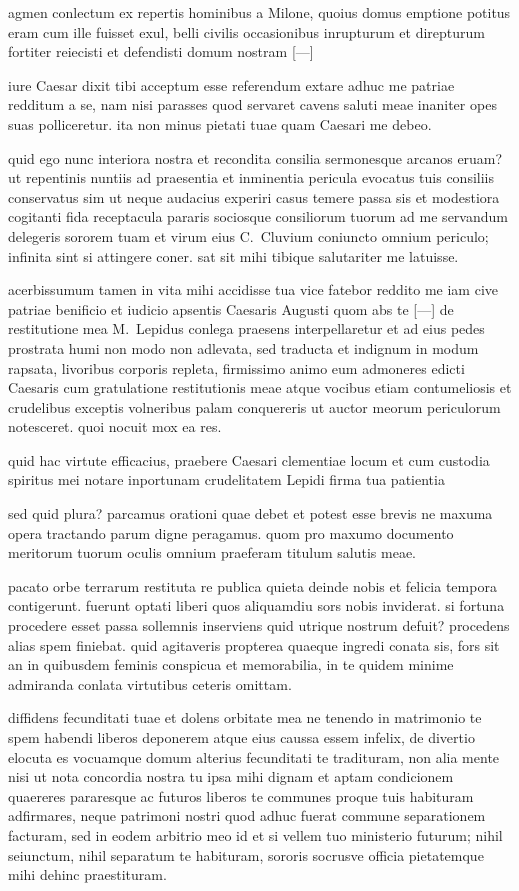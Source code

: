 agmen conlectum ex repertis hominibus a Milone, quoius domus emptione potitus eram cum ille fuisset exul, belli civilis occasionibus inrupturum et direpturum fortiter reiecisti et defendisti domum nostram [---] 

iure Caesar dixit tibi acceptum esse referendum extare adhuc me patriae redditum a se, nam nisi parasses quod servaret cavens saluti meae inaniter opes suas polliceretur. ita non minus pietati tuae quam Caesari me debeo. 

quid ego nunc interiora nostra et recondita consilia sermonesque arcanos eruam? ut repentinis nuntiis ad praesentia et inminentia pericula evocatus tuis consiliis conservatus sim ut neque audacius experiri casus temere passa sis et modestiora cogitanti fida receptacula pararis sociosque consiliorum tuorum ad me servandum delegeris sororem tuam et virum eius C.~Cluvium coniuncto omnium periculo; infinita sint si attingere coner. sat sit mihi tibique salutariter me latuisse.

acerbissumum tamen in vita mihi accidisse tua vice fatebor reddito me iam cive patriae benificio et iudicio apsentis Caesaris Augusti quom abs te [---] de restitutione mea M.~Lepidus conlega praesens interpellaretur et ad eius pedes prostrata humi non modo non adlevata, sed traducta et indignum in modum rapsata, livoribus corporis repleta, firmissimo animo eum admoneres edicti Caesaris cum gratulatione restitutionis meae atque vocibus etiam contumeliosis et crudelibus exceptis volneribus palam conquereris ut auctor meorum periculorum notesceret. quoi nocuit mox ea res.

quid hac virtute efficacius, praebere Caesari clementiae locum et cum custodia spiritus mei notare inportunam crudelitatem Lepidi firma tua patientia

sed quid plura? parcamus orationi quae debet et potest esse brevis ne maxuma opera tractando parum digne peragamus. quom pro maxumo documento meritorum tuorum oculis omnium praeferam titulum salutis meae. 

pacato orbe terrarum restituta re publica quieta deinde nobis et felicia tempora contigerunt. fuerunt optati liberi quos aliquamdiu sors nobis inviderat. si fortuna procedere esset passa sollemnis inserviens quid utrique nostrum defuit? procedens alias spem finiebat. quid agitaveris propterea quaeque ingredi conata sis, fors sit an in quibusdem feminis conspicua et memorabilia, in te quidem minime admiranda conlata virtutibus ceteris omittam. 

diffidens fecunditati tuae et dolens orbitate mea ne tenendo in matrimonio te spem habendi liberos deponerem atque eius caussa essem infelix, de divertio elocuta es vocuamque domum alterius fecunditati te tradituram, non alia mente nisi ut nota concordia nostra tu ipsa mihi dignam et aptam condicionem quaereres pararesque ac futuros liberos te communes proque tuis habituram adfirmares, neque patrimoni nostri quod adhuc fuerat commune separationem facturam, sed in eodem arbitrio meo id et si vellem tuo ministerio futurum; nihil seiunctum, nihil separatum te habituram, sororis socrusve officia pietatemque mihi dehinc praestituram. 

